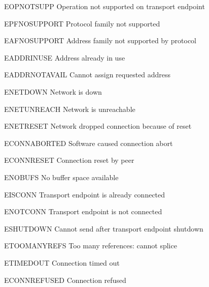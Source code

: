 \begin{datadesc}{EOPNOTSUPP} Operation not supported on transport endpoint \end{datadesc}
\begin{datadesc}{EPFNOSUPPORT} Protocol family not supported \end{datadesc}
\begin{datadesc}{EAFNOSUPPORT} Address family not supported by protocol \end{datadesc}
\begin{datadesc}{EADDRINUSE} Address already in use \end{datadesc}
\begin{datadesc}{EADDRNOTAVAIL} Cannot assign requested address \end{datadesc}
\begin{datadesc}{ENETDOWN} Network is down \end{datadesc}
\begin{datadesc}{ENETUNREACH} Network is unreachable \end{datadesc}
\begin{datadesc}{ENETRESET} Network dropped connection because of reset \end{datadesc}
\begin{datadesc}{ECONNABORTED} Software caused connection abort \end{datadesc}
\begin{datadesc}{ECONNRESET} Connection reset by peer \end{datadesc}
\begin{datadesc}{ENOBUFS} No buffer space available \end{datadesc}
\begin{datadesc}{EISCONN} Transport endpoint is already connected \end{datadesc}
\begin{datadesc}{ENOTCONN} Transport endpoint is not connected \end{datadesc}
\begin{datadesc}{ESHUTDOWN} Cannot send after transport endpoint shutdown \end{datadesc}
\begin{datadesc}{ETOOMANYREFS} Too many references: cannot splice \end{datadesc}
\begin{datadesc}{ETIMEDOUT} Connection timed out \end{datadesc}
\begin{datadesc}{ECONNREFUSED} Connection refused \end{datadesc}

